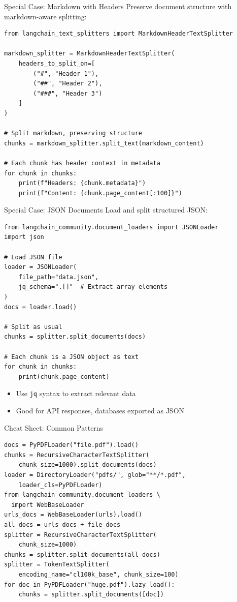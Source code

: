\documentclass[aspectratio=169,11pt]{beamer}
\begin{document}
\begin{frame}[fragile]{Special Case: Markdown with Headers}
  Preserve document structure with markdown-aware splitting:
  \begin{lstlisting}
from langchain_text_splitters import MarkdownHeaderTextSplitter

markdown_splitter = MarkdownHeaderTextSplitter(
    headers_to_split_on=[
        ("#", "Header 1"),
        ("##", "Header 2"),
        ("###", "Header 3")
    ]
)

# Split markdown, preserving structure
chunks = markdown_splitter.split_text(markdown_content)

# Each chunk has header context in metadata
for chunk in chunks:
    print(f"Headers: {chunk.metadata}")
    print(f"Content: {chunk.page_content[:100]}")
  \end{lstlisting}
\end{frame}

\begin{frame}[fragile]{Special Case: JSON Documents}
  Load and split structured JSON:
  \begin{lstlisting}
from langchain_community.document_loaders import JSONLoader
import json

# Load JSON file
loader = JSONLoader(
    file_path="data.json",
    jq_schema=".[]"  # Extract array elements
)
docs = loader.load()

# Split as usual
chunks = splitter.split_documents(docs)

# Each chunk is a JSON object as text
for chunk in chunks:
    print(chunk.page_content)
  \end{lstlisting}

  \vspace{0.5cm}
  \begin{itemize}
    \setlength{\itemsep}{1pt}
    \item Use \texttt{jq} syntax to extract relevant data
    \item Good for API responses, databases exported as JSON
  \end{itemize}
\end{frame}

\begin{frame}[fragile]{Cheat Sheet: Common Patterns}
  \scriptsize
  \begin{lstlisting}[basicstyle=\ttfamily\tiny]
docs = PyPDFLoader("file.pdf").load()
chunks = RecursiveCharacterTextSplitter(
    chunk_size=1000).split_documents(docs)
loader = DirectoryLoader("pdfs/", glob="**/*.pdf",
    loader_cls=PyPDFLoader)
from langchain_community.document_loaders \
  import WebBaseLoader
urls_docs = WebBaseLoader(urls).load()
all_docs = urls_docs + file_docs
splitter = RecursiveCharacterTextSplitter(
    chunk_size=1000)
chunks = splitter.split_documents(all_docs)
splitter = TokenTextSplitter(
    encoding_name="cl100k_base", chunk_size=100)
for doc in PyPDFLoader("huge.pdf").lazy_load():
    chunks = splitter.split_documents([doc])
  \end{lstlisting}
\end{frame}
\end{document}
